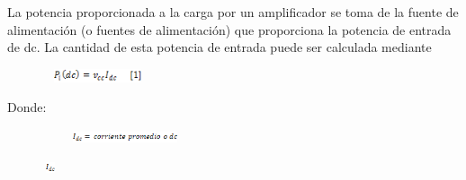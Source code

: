 \documentclass[12pt]{article}
\begin{document}
La potencia proporcionada a la carga por un amplificador se toma de la fuente de alimentación (o fuentes de alimentación) que proporciona la potencia de entrada de dc. La cantidad de esta potencia de entrada puede ser calculada mediante\par




\begin{figure}[H]
	\begin{Center}
		\includegraphics[width=1.26in,height=0.15in]{./media/image13.gif}
	\end{Center}
\end{figure}



\par

Donde:\par




\begin{figure}[H]
	\begin{Center}
		\includegraphics[width=1.89in,height=0.12in]{./media/image14.gif}
	\end{Center}
\end{figure}



\par




\begin{figure}[H]
	\begin{Center}
		\includegraphics[width=0.17in,height=0.12in]{./media/image15.gif}
	\end{Center}
\end{figure}
\end{document}
